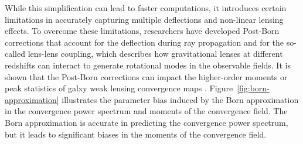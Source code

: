 While this simplification can lead to faster computations, it introduces certain limitations in accurately capturing multiple deflections and non-linear lensing effects. 
To overcome these limitations, researchers have developed Post-Born corrections \citep{2002ApJ...574...19C, 2005PhRvD..72j3004D} that account for the deflection during ray propagation and for the so-called lens-lens coupling, which describes how gravitational lenses at different redshifts can interact to generate rotational modes in the observable fields. It is shown that the Post-Born corrections can impact the higher-order moments or peak statistics of galxy weak lensing convergence maps \citep{2017PhRvD..95l3503P, 2019JCAP...10..057F}. Figure~\ref{fig:born-approximation} \citep{2017PhRvD..95l3503P} illustrates the parameter bias induced by the Born approximation in the convergence power spectrum and moments of the convergence field. The Born approximation is accurate in predicting the convergence power spectrum, but it leads to significant biases in the moments of the convergence field.

